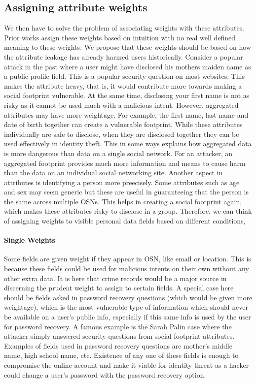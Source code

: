 \documentclass[12pt,conference]{IEEEtran}
\begin{document}
\subsection{Assigning attribute weights}
We then have to solve the problem of associating weights with these attributes. Prior works assign these weights based on intuition with no real well defined meaning to these weights. We propose that these weights should be based on how the attribute leakage has already harmed users historically. Consider a popular attack in the past where a user might have disclosed his mothers maiden name as a public profile field. This is a popular security question on most websites. This makes the attribute heavy, that is, it would contribute more towards making a social footprint vulnerable. At the same time, disclosing your first name is not as risky as it cannot be used much with a malicious intent. However, aggregated attributes may have more weightage. For example, the first name, last name and date of birth together can create a vulnerable footprint. While these attributes individually are safe to disclose, when they are disclosed together they can be used effectively in identity theft. This in some ways explains how aggregated data is more dangerous than data on a single social network. For an attacker, an aggregated footprint provides much more information and means to cause harm than the data on an individual social networking site. Another aspect in attributes is identifying a person more preecisely. Some attributes such as age and sex may seem generic but these are useful in guaranteeing that the person is the same across multiple OSNs. This helps in creating a social footprint again, which makes these attributes risky to disclose in a group. Therefore, we can think of assigning weights to visible personal data fields based on different conditions, 
\paragraph*{Single Weights}  Some fields are given weight if they appear in OSN, like email or location. This is because these fields could be used for malicious intents on their own without any other extra data. It is here that crime records would be a major source in discerning the prudent weight to assign to certain fields. A special case here should be fields asked in password recovery questions (which would be given more weightage), which is the most vulnerable type of information which should never be available on a user’s public info, especially if this same info is used by the user for password recovery. A famous example is the Sarah Palin case where the attacker simply answered security questions from social footprint attributes. Examples of fields used in password recovery questions are mother’s middle name, high school name, etc. Existence of any one of these fields is enough to compromise the online account and make it viable for identity threat as a hacker could change a user’s password with the password recovery option.
\end{document}
